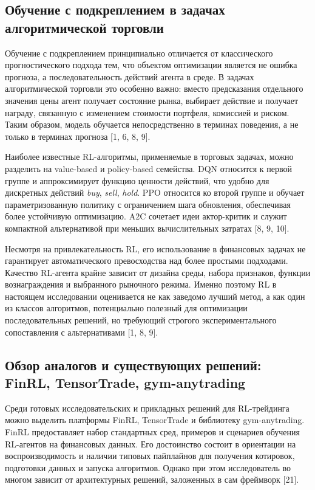 \subsection{Обучение с подкреплением в задачах алгоритмической торговли}

Обучение с подкреплением принципиально отличается от классического прогностического подхода тем, что объектом оптимизации является не ошибка прогноза, а последовательность действий агента в среде. В задачах алгоритмической торговли это особенно важно: вместо предсказания отдельного значения цены агент получает состояние рынка, выбирает действие и получает награду, связанную с изменением стоимости портфеля, комиссией и риском. Таким образом, модель обучается непосредственно в терминах поведения, а не только в терминах прогноза [1, 6, 8, 9].

Наиболее известные RL-алгоритмы, применяемые в торговых задачах, можно разделить на value-based и policy-based семейства. DQN относится к первой группе и аппроксимирует функцию ценности действий, что удобно для дискретных действий \textit{buy}, \textit{sell}, \textit{hold}. PPO относится ко второй группе и обучает параметризованную политику с ограничением шага обновления, обеспечивая более устойчивую оптимизацию. A2C сочетает идеи актор-критик и служит компактной альтернативой при меньших вычислительных затратах [8, 9, 10].

Несмотря на привлекательность RL, его использование в финансовых задачах не гарантирует автоматического превосходства над более простыми подходами. Качество RL-агента крайне зависит от дизайна среды, набора признаков, функции вознаграждения и выбранного рыночного режима. Именно поэтому RL в настоящем исследовании оценивается не как заведомо лучший метод, а как один из классов алгоритмов, потенциально полезный для оптимизации последовательных решений, но требующий строгого экспериментального сопоставления с альтернативами [1, 8, 9].

\subsection{Обзор аналогов и существующих решений: FinRL, TensorTrade, gym-anytrading}

Среди готовых исследовательских и прикладных решений для RL-трейдинга можно выделить платформы FinRL, TensorTrade и библиотеку gym-anytrading. FinRL предоставляет набор стандартных сред, примеров и сценариев обучения RL-агентов на финансовых данных. Его достоинство состоит в ориентации на воспроизводимость и наличии типовых пайплайнов для получения котировок, подготовки данных и запуска алгоритмов. Однако при этом исследователь во многом зависит от архитектурных решений, заложенных в сам фреймворк [21].

